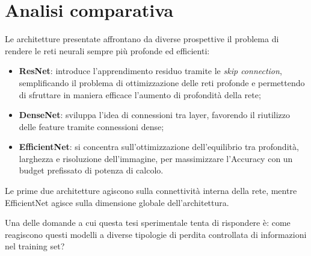 \clearpage
\section{Analisi comparativa}

Le architetture presentate affrontano da diverse prospettive il problema di rendere le reti neurali sempre più profonde ed efficienti:

\begin{itemize}
    \item \textbf{ResNet}: introduce l'apprendimento residuo tramite le \textit{skip connection}, semplificando il problema di ottimizzazione delle reti profonde e permettendo di sfruttare in maniera efficace l'aumento di profondità della rete;
    \item \textbf{DenseNet}: sviluppa l'idea di connessioni tra layer, favorendo il riutilizzo delle feature tramite connessioni dense;
    \item \textbf{EfficientNet}: si concentra sull'ottimizzazione dell'equilibrio tra profondità, larghezza e risoluzione dell'immagine, per massimizzare l'Accuracy con un budget prefissato di potenza di calcolo.
\end{itemize}

Le prime due architetture agiscono sulla connettività interna della rete, mentre EfficientNet agisce sulla dimensione globale dell'architettura.

Una delle domande a cui questa tesi sperimentale tenta di rispondere è: come reagiscono questi modelli a diverse tipologie di perdita controllata di informazioni nel training set?